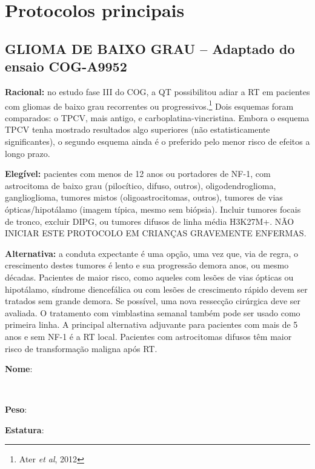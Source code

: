 \documentclass[11pt,a4paper,oldfontcommands]{memoir}
\def\entrywithlabel[#1]#2{\parbox{#1}{{\small #2:} \hrulefill}}
\begin{document}
\appendix
\chapter{Protocolos principais}
\cleardoublepage
\section{GLIOMA DE BAIXO GRAU -- Adaptado do ensaio COG-A9952}

\textbf{Racional:} no estudo fase III do COG, a QT possibilitou adiar a RT em pacientes com gliomas de baixo grau recorrentes ou progressivos.\footnote{Ater \textit{et al}, 2012} Dois esquemas foram comparados: o TPCV, mais antigo, e carboplatina-vincristina. Embora o esquema TPCV tenha mostrado resultados algo superiores (não estatisticamente significantes), o segundo esquema ainda é o preferido pelo menor risco de efeitos a longo prazo.{\let\thefootnote\relax{}}

\textbf{Elegível:} pacientes com menos de 12 anos ou portadores de NF-1, com astrocitoma de baixo grau (pilocítico, difuso, outros), oligodendroglioma, ganglioglioma, tumores mistos (oligoastrocitomas, outros), tumores de vias ópticas/hipotálamo (imagem típica, mesmo sem biópsia). Incluir tumores focais de tronco, excluir DIPG, ou tumores difusos de linha média H3K27M+. NÃO INICIAR ESTE PROTOCOLO EM CRIANÇAS GRAVEMENTE ENFERMAS.


\textbf{Alternativa:} a conduta expectante é uma opção, uma vez que, via de regra, o crescimento destes tumores é lento e sua progressão demora anos, ou mesmo décadas. Pacientes de maior risco, como aqueles com lesões de vias ópticas ou hipotálamo, síndrome diencefálica ou com lesões de crescimento rápido devem ser tratados sem grande demora. Se possível, uma nova ressecção cirúrgica deve ser avaliada. O tratamento com vimblastina semanal também pode ser usado como primeira linha. A principal alternativa adjuvante para pacientes com mais de 5 anos e sem NF-1 é a RT local. Pacientes com astrocitomas difusos têm maior risco de transformação maligna após RT.
\\[0.4cm]
\entrywithlabel[1\hsize]{\textbf{Nome}}\hfill
\\[0.3cm]
\entrywithlabel[.45\hsize]{\textbf{Peso}}\hfill  \entrywithlabel[.45\hsize]{\textbf{Estatura}}
\end{document}
